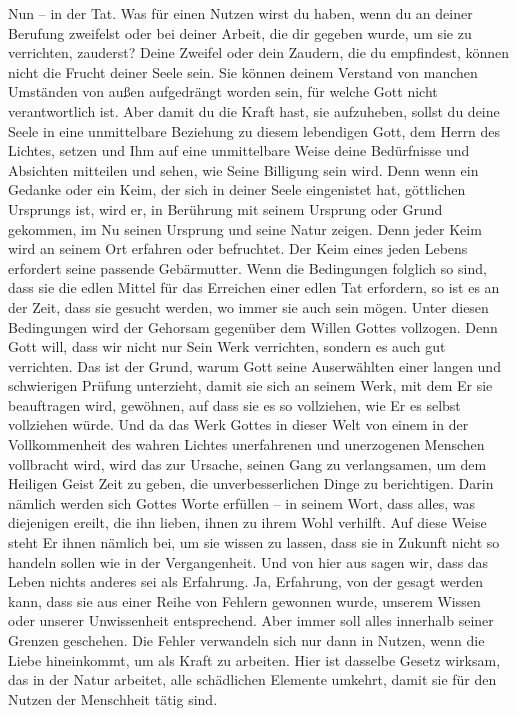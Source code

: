 Nun -- in der Tat. Was für einen Nutzen wirst du haben, wenn du an deiner Berufung zweifelst oder bei deiner Arbeit, die dir gegeben wurde, um sie zu verrichten, zauderst? Deine Zweifel oder dein Zaudern, die du empfindest, können nicht die Frucht deiner Seele sein. Sie können deinem Verstand von manchen Umständen von außen aufgedrängt worden sein, für welche Gott nicht verantwortlich ist. Aber damit du die Kraft hast, sie aufzuheben, sollst du deine Seele in eine unmittelbare Beziehung zu diesem lebendigen Gott, dem Herrn des Lichtes, setzen und Ihm auf eine unmittelbare Weise deine Bedürfnisse und Absichten mitteilen und sehen, wie Seine Billigung sein wird. Denn wenn ein Gedanke oder ein Keim, der sich in deiner Seele eingenistet hat, göttlichen Ursprungs ist, wird er, in Berührung mit seinem Ursprung oder Grund gekommen, im Nu seinen Ursprung und seine Natur zeigen. Denn jeder Keim wird an seinem Ort erfahren oder befruchtet. Der Keim eines jeden Lebens erfordert seine passende Gebärmutter. Wenn die Bedingungen folglich so sind, dass sie die edlen Mittel für das Erreichen einer edlen Tat erfordern, so ist es an der Zeit, dass sie gesucht werden, wo immer sie auch sein mögen. Unter diesen Bedingungen wird der Gehorsam gegenüber dem Willen Gottes vollzogen. Denn Gott will, dass wir nicht nur Sein Werk verrichten, sondern es auch gut verrichten. Das ist der Grund, warum Gott seine Auserwählten einer langen und schwierigen Prüfung unterzieht, damit sie sich an seinem Werk, mit dem Er sie beauftragen wird, gewöhnen, auf dass sie es so vollziehen, wie Er es selbst vollziehen würde. Und da das Werk Gottes in dieser Welt von einem in der Vollkommenheit des wahren Lichtes unerfahrenen und unerzogenen Menschen vollbracht wird, wird das zur Ursache, seinen Gang zu verlangsamen, um dem Heiligen Geist Zeit zu geben, die unverbesserlichen Dinge zu berichtigen. Darin nämlich werden sich Gottes Worte erfüllen -- in seinem Wort, dass alles, was diejenigen ereilt, die ihn lieben, ihnen zu ihrem Wohl verhilft. Auf diese Weise steht Er ihnen nämlich bei, um sie wissen zu lassen, dass sie in Zukunft nicht so handeln sollen wie in der Vergangenheit. Und von hier aus sagen wir, dass das Leben nichts anderes sei als Erfahrung. Ja, Erfahrung, von der gesagt werden kann, dass sie aus einer Reihe von Fehlern gewonnen wurde, unserem Wissen oder unserer Unwissenheit entsprechend. Aber immer soll alles innerhalb seiner Grenzen geschehen. Die Fehler verwandeln sich nur dann in Nutzen, wenn die Liebe hineinkommt, um als Kraft zu arbeiten. Hier ist dasselbe Gesetz wirksam, das in der Natur arbeitet, alle schädlichen Elemente umkehrt, damit sie für den Nutzen der Menschheit tätig sind. 


